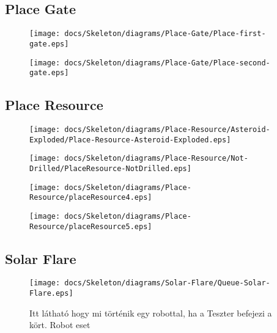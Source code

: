\subsection{Place Gate}

\begin{figure}[H] 
    \centering 
    \texttt{[image: docs/Skeleton/diagrams/Place-Gate/Place-first-gate.eps]} 
    \caption{} 
\end{figure} 

\begin{figure}[H] 
    \centering 
    \texttt{[image: docs/Skeleton/diagrams/Place-Gate/Place-second-gate.eps]} 
    \caption{} 
\end{figure} 



\subsection{Place Resource}

\begin{figure}[H] 
    \centering 
    \texttt{[image: docs/Skeleton/diagrams/Place-Resource/Asteroid-Exploded/Place-Resource-Asteroid-Exploded.eps]} 
    \caption{} 
\end{figure} 

\begin{figure}[H] 
    \centering 
    \texttt{[image: docs/Skeleton/diagrams/Place-Resource/Not-Drilled/PlaceResource-NotDrilled.eps]} 
    \caption{} 
\end{figure} 

\begin{figure}[H] 
    \centering 
    \texttt{[image: docs/Skeleton/diagrams/Place-Resource/placeResource4.eps]} 
    \caption{} 
\end{figure} 

\begin{figure}[H] 
    \centering 
    \texttt{[image: docs/Skeleton/diagrams/Place-Resource/placeResource5.eps]} 
    \caption{} 
\end{figure} 

\subsection{Solar Flare}

\begin{figure}[H] 
    \centering 
    \texttt{[image: docs/Skeleton/diagrams/Solar-Flare/Queue-Solar-Flare.eps]} 
    \caption{Itt látható hogy mi történik egy robottal, ha a Teszter befejezi a kört. Robot eset} 
\end{figure}

